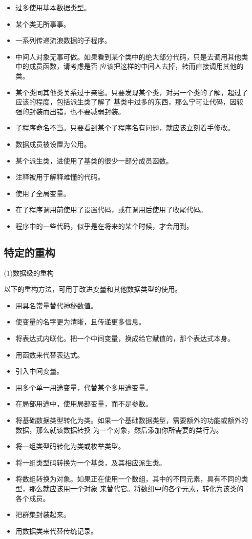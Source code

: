 \documentclass{article}
\begin{document}
\begin{itemize}
    \item 过多使用基本数据类型。
    \item 某个类无所事事。
    \item 一系列传递流浪数据的子程序。
    \item 中间人对象无事可做。如果看到某个类中的绝大部分代码，只是去调用其他类中的成员函数，请考虑是否
    应该把这样的中间人去掉，转而直接调用其他的类。
    \item 某个类同其他类关系过于亲密。只要发现某个类，对另一个类的了解，超过了应该的程度，包括派生类了解了
    基类中过多的东西，那么宁可让代码，因较强的封装而出错，也不要减弱封装。
    \item 子程序命名不当。只要看到某个子程序名有问题，就应该立刻着手修改。
    \item 数据成员被设置为公用。
    \item 某个派生类，进使用了基类的很少一部分成员函数。
    \item 注释被用于解释难懂的代码。
    \item 使用了全局变量。
    \item 在子程序调用前使用了设置代码，或在调用后使用了收尾代码。
    \item 程序中的一些代码，似乎是在将来的某个时候，才会用到。
\end{itemize}

\subsection{特定的重构}
\par
(1)数据级的重构
\par
以下的重构方法，可用于改进变量和其他数据类型的使用。
\begin{itemize}
    \item 用具名常量替代神秘数值。
    \item 使变量的名字更为清晰，且传递更多信息。
    \item 将表达式内联化。把一个中间变量，换成给它赋值的，那个表达式本身。
    \item 用函数来代替表达式。
    \item 引入中间变量。
    \item 用多个单一用途变量，代替某个多用途变量。
    \item 在局部用途中，使用局部变量，而不是参数。
    \item 将基础数据类型转化为类。如果一个基础数据类型，需要额外的功能或额外的数据，那么就该数据转换
    为一个对象，然后添加你所需要的类行为。
    \item 将一组类型码转化为类或枚举类型。
    \item 将一组类型码转换为一个基类，及其相应派生类。
    \item 将数组转换为对象。如果正在使用一个数组，其中的不同元素，具有不同的类型，那么就应该用一个对象
    来替代它。将数组中的各个元素，转化为该类的各个成员。
    \item 把群集封装起来。
    \item 用数据类来代替传统记录。
\end{itemize}
\end{document}
